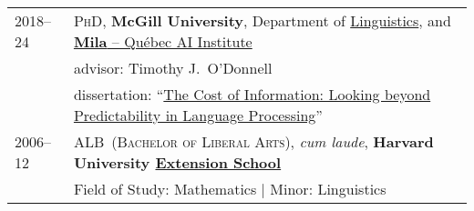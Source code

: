 \documentclass[11pt,a4paper]{article}
\begin{document}
\begin{longtable}{p{1.7cm}|p{15cm}}
  2018--24%
    &\textsc{PhD},
     \textbf{McGill University},
     Department of \href{https://www.mcgill.ca/linguistics/graduate}{Linguistics}, and
     \href{https://mila.quebec}{\textbf{Mila} -- Québec AI Institute}\\
    &\quad{}advisor: Timothy J.\ O'Donnell\\
    &\quad{}dissertation:
      ``\href{https://jahoo.github.io/2024/08/02/dissertation.html}{The Cost of Information:
       Looking beyond Predictability in Language Processing}''\\
  2006--12%
    &\textsc{ALB\ (Bachelor of Liberal Arts)}, \emph{cum laude},
     \textbf{Harvard University \href{https://extension.harvard.edu/}{Extension
     School}}\\
    &\quad{}Field of Study: Mathematics | Minor: Linguistics
  \end{longtable}
\end{document}
